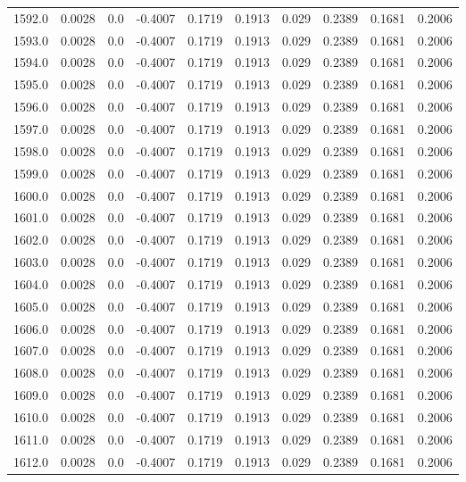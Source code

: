 \begin{longtable}{lrrrrrrrrr}
1592.0 & 0.0028 & 0.0 & -0.4007 & 0.1719 & 0.1913 & 0.029 & 0.2389 & 0.1681 & 0.2006 \\
1593.0 & 0.0028 & 0.0 & -0.4007 & 0.1719 & 0.1913 & 0.029 & 0.2389 & 0.1681 & 0.2006 \\
1594.0 & 0.0028 & 0.0 & -0.4007 & 0.1719 & 0.1913 & 0.029 & 0.2389 & 0.1681 & 0.2006 \\
1595.0 & 0.0028 & 0.0 & -0.4007 & 0.1719 & 0.1913 & 0.029 & 0.2389 & 0.1681 & 0.2006 \\
1596.0 & 0.0028 & 0.0 & -0.4007 & 0.1719 & 0.1913 & 0.029 & 0.2389 & 0.1681 & 0.2006 \\
1597.0 & 0.0028 & 0.0 & -0.4007 & 0.1719 & 0.1913 & 0.029 & 0.2389 & 0.1681 & 0.2006 \\
1598.0 & 0.0028 & 0.0 & -0.4007 & 0.1719 & 0.1913 & 0.029 & 0.2389 & 0.1681 & 0.2006 \\
1599.0 & 0.0028 & 0.0 & -0.4007 & 0.1719 & 0.1913 & 0.029 & 0.2389 & 0.1681 & 0.2006 \\
1600.0 & 0.0028 & 0.0 & -0.4007 & 0.1719 & 0.1913 & 0.029 & 0.2389 & 0.1681 & 0.2006 \\
1601.0 & 0.0028 & 0.0 & -0.4007 & 0.1719 & 0.1913 & 0.029 & 0.2389 & 0.1681 & 0.2006 \\
1602.0 & 0.0028 & 0.0 & -0.4007 & 0.1719 & 0.1913 & 0.029 & 0.2389 & 0.1681 & 0.2006 \\
1603.0 & 0.0028 & 0.0 & -0.4007 & 0.1719 & 0.1913 & 0.029 & 0.2389 & 0.1681 & 0.2006 \\
1604.0 & 0.0028 & 0.0 & -0.4007 & 0.1719 & 0.1913 & 0.029 & 0.2389 & 0.1681 & 0.2006 \\
1605.0 & 0.0028 & 0.0 & -0.4007 & 0.1719 & 0.1913 & 0.029 & 0.2389 & 0.1681 & 0.2006 \\
1606.0 & 0.0028 & 0.0 & -0.4007 & 0.1719 & 0.1913 & 0.029 & 0.2389 & 0.1681 & 0.2006 \\
1607.0 & 0.0028 & 0.0 & -0.4007 & 0.1719 & 0.1913 & 0.029 & 0.2389 & 0.1681 & 0.2006 \\
1608.0 & 0.0028 & 0.0 & -0.4007 & 0.1719 & 0.1913 & 0.029 & 0.2389 & 0.1681 & 0.2006 \\
1609.0 & 0.0028 & 0.0 & -0.4007 & 0.1719 & 0.1913 & 0.029 & 0.2389 & 0.1681 & 0.2006 \\
1610.0 & 0.0028 & 0.0 & -0.4007 & 0.1719 & 0.1913 & 0.029 & 0.2389 & 0.1681 & 0.2006 \\
1611.0 & 0.0028 & 0.0 & -0.4007 & 0.1719 & 0.1913 & 0.029 & 0.2389 & 0.1681 & 0.2006 \\
1612.0 & 0.0028 & 0.0 & -0.4007 & 0.1719 & 0.1913 & 0.029 & 0.2389 & 0.1681 & 0.2006 \\

\end{longtable}
